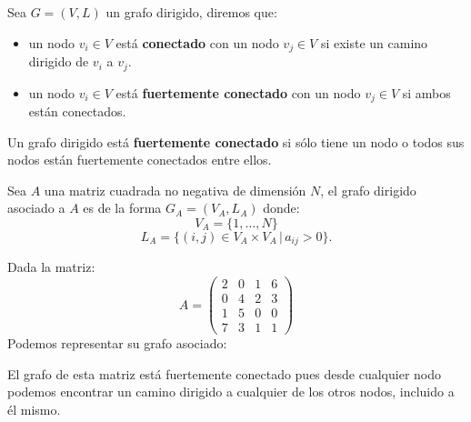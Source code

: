 \begin{definition}
    Sea $G=(V,L)$ un grafo dirigido, diremos que:
    \begin{itemize}
        \item un nodo $v_i\in V$ está \textbf{conectado} con un nodo $v_j\in V$ si existe un camino dirigido de $v_i$ a $v_j$.
        \item un nodo $v_i\in V$ está \textbf{fuertemente conectado} con un nodo $v_j\in V$ si ambos están conectados.
    \end{itemize}
    Un grafo dirigido está \textbf{fuertemente conectado} si sólo tiene un nodo o todos sus nodos están fuertemente conectados entre ellos.
\end{definition}

\begin{definition}
    Sea $A$ una matriz cuadrada no negativa de dimensión $N$, el grafo dirigido asociado a $A$ es de la forma $G_A=(V_A,L_A)$ donde:
    \[V_A=\{1,\dots,N\}\] 
    \[L_A=\{(i,j)\in V_A\times V_A \,|\, a_{ij}>0\}.\]
\end{definition}

\begin{exampleth}
    Dada la matriz:
    \[A=\begin{pmatrix}
        2 & 0 & 1 & 6 \\
        0 & 4 & 2 & 3 \\
        1 & 5 & 0 & 0 \\
        7 & 3 & 1 & 1 
    \end{pmatrix}\]
    Podemos representar su grafo asociado:
    \begin{center}
    \end{center}
    El grafo de esta matriz está fuertemente conectado pues desde cualquier nodo podemos encontrar un camino dirigido a cualquier de los otros nodos, incluido a él mismo.
\end{exampleth}

